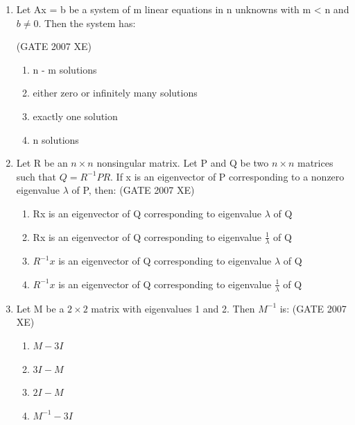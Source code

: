 \documentclass[journal,cmex10]{IEEEtran}
\theoremstyle{remark}
\numberwithin{equation}{enumi}
\numberwithin{figure}{enumi}
\begin{document}
\begin{enumerate}
    \item Let Ax = b be a system of m linear equations in n unknowns with m < n and $b \neq 0$. Then the system has:
  
    \hfill{(GATE 2007 XE)}
    \begin{multicols}{4}
    \begin{enumerate}
        \item n - m  solutions
        \item either zero or infinitely many solutions
        \item exactly one solution
        \item n  solutions
    \end{enumerate}
\end{multicols}

    \item Let R be an $n \times n $ nonsingular matrix. Let P and Q be two  $n \times n $ matrices such that $ Q = R^{-1}PR $. If x  is an eigenvector of  P corresponding to a nonzero eigenvalue $\lambda$ of P, then:
    \hfill{(GATE 2007 XE)}
    \begin{multicols}{4}
    \begin{enumerate}
        \item Rx  is an eigenvector of Q  corresponding to eigenvalue $\lambda$ of  Q 
        \item  Rx  is an eigenvector of Q  corresponding to eigenvalue $ \frac{1}{\lambda} $ of Q 
        \item $R^{-1}x$  is an eigenvector of Q  corresponding to eigenvalue $\lambda$ of Q 
        \item $ R^{-1}x$ is an eigenvector of Q  corresponding to eigenvalue $ \frac{1}{\lambda} $ of Q 
    \end{enumerate}
\end{multicols}

    \item Let M  be a $2 \times 2$ matrix with eigenvalues 1 and 2. Then  $ M^{-1}$ is:
    \hfill{(GATE 2007 XE)}
    \begin{multicols}{4}
    \begin{enumerate}[label=\alph*)]
        \item $M - 3I$
        \item $3I - M$
        \item $2I - M$
        \item $M^{-1} - 3I$
    \end{enumerate}
\end{multicols}


\end{enumerate}
\end{document}

